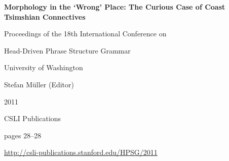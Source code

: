 \documentclass[a4paper,11pt]{article}
\begin{document}
\begin{center}
  {\huge\bf Morphology in the `Wrong' Place: The Curious Case of Coast Tsimshian Connectives\par}

  \bigskip

  {\LARGE  \par}

  \vspace*{3\bigskipamount}

  Proceedings of the 18th International Conference on\par Head-Driven Phrase Structure Grammar

  \bigskip

  University of Washington

  \medskip

  Stefan Müller (Editor)

  \medskip

  2011

  \medskip

  CSLI Publications

  \medskip

  pages 28--28

  \medskip

  \url{http://csli-publications.stanford.edu/HPSG/2011}
\end{center}

\newpage

        
\end{document}

